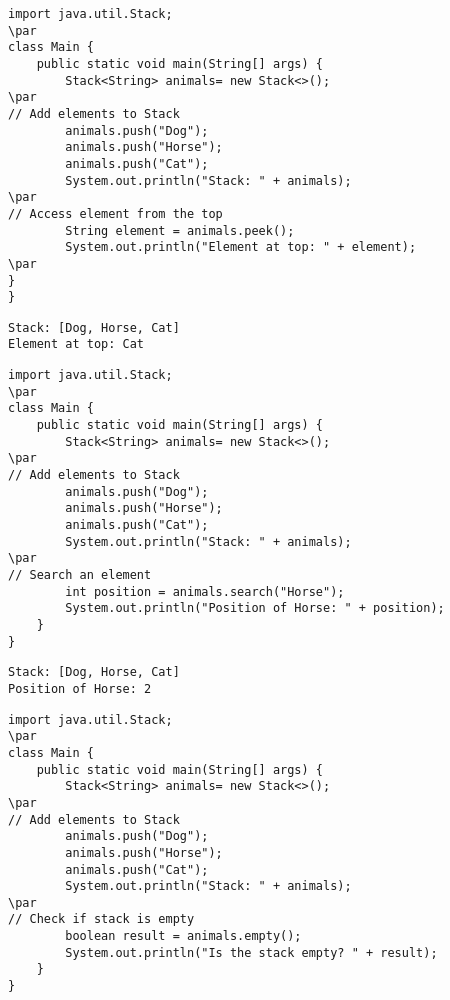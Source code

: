 \documentclass{book}
\def\lthtmlcheckvsize{\ifdim\ht\sizebox<\vsize 
  \ifdim\wd\sizebox<\hsize\expandafter\hfill\fi \expandafter\vfill
  \else\expandafter\vss\fi}%
\begin{document}
{\newpage\clearpage
{}%
\begin{lstlisting}
import java.util.Stack;
\par
class Main {
    public static void main(String[] args) {
        Stack<String> animals= new Stack<>();
\par
// Add elements to Stack
        animals.push("Dog");
        animals.push("Horse");
        animals.push("Cat");
        System.out.println("Stack: " + animals);
\par
// Access element from the top
        String element = animals.peek();
        System.out.println("Element at top: " + element);
\par
}
}
\end{lstlisting}%
\lthtmlfigureZ
\lthtmlcheckvsize\clearpage}

{\newpage\clearpage
{}%
\begin{lstlisting}
Stack: [Dog, Horse, Cat]
Element at top: Cat
\end{lstlisting}%
\lthtmlfigureZ
\lthtmlcheckvsize\clearpage}

{\newpage\clearpage
{}%
\begin{lstlisting}
import java.util.Stack;
\par
class Main {
    public static void main(String[] args) {
        Stack<String> animals= new Stack<>();
\par
// Add elements to Stack
        animals.push("Dog");
        animals.push("Horse");
        animals.push("Cat");
        System.out.println("Stack: " + animals);
\par
// Search an element
        int position = animals.search("Horse");
        System.out.println("Position of Horse: " + position);
    }
}
\end{lstlisting}%
\lthtmlfigureZ
\lthtmlcheckvsize\clearpage}

{\newpage\clearpage
{}%
\begin{lstlisting}
Stack: [Dog, Horse, Cat]
Position of Horse: 2
\end{lstlisting}%
\lthtmlfigureZ
\lthtmlcheckvsize\clearpage}

{\newpage\clearpage
{}%
\begin{lstlisting}
import java.util.Stack;
\par
class Main {
    public static void main(String[] args) {
        Stack<String> animals= new Stack<>();
\par
// Add elements to Stack
        animals.push("Dog");
        animals.push("Horse");
        animals.push("Cat");
        System.out.println("Stack: " + animals);
\par
// Check if stack is empty
        boolean result = animals.empty();
        System.out.println("Is the stack empty? " + result);
    }
}
\end{lstlisting}%
\lthtmlfigureZ
\lthtmlcheckvsize\clearpage}
\end{document}
